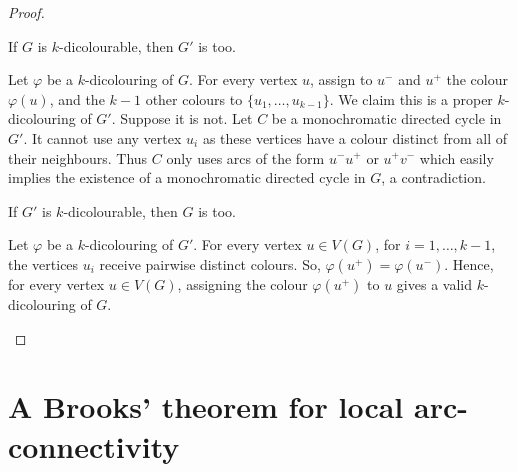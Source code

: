\begin{proof}

\begin{claim} 
If $G$ is $k$-dicolourable, then $G'$ is too. 
\end{claim}

\begin{proofclaim}
Let $\varphi$ be a $k$-dicolouring of $G$. For every vertex $u$, assign to $u^-$ and $u^+$ the colour $\varphi(u)$, and the $k-1$ other colours to $\{u_1, \dots, u_{k-1}\}$. We claim this is a proper $k$-dicolouring of $G'$. 
Suppose it is not. Let $C$ be a monochromatic directed cycle in $G'$. It cannot use any vertex $u_i$ as these vertices have a colour distinct from all of their neighbours. Thus $C$ only uses arcs of the form $u^-u^+$ or $u^+v^-$ which easily implies the existence of a monochromatic directed cycle in $G$, a contradiction.  
\end{proofclaim}

\begin{claim}
If $G'$ is $k$-dicolourable, then $G$ is too. 
\end{claim}

\begin{proofclaim}

Let $\varphi$ be a $k$-dicolouring of $G'$. 
For every vertex $u \in V(G)$, for $i=1, \dots, k-1$, the vertices $u_i$ receive pairwise distinct colours. So, $\varphi(u^+)=\varphi(u^-)$. Hence, for every vertex $u \in V(G)$, assigning the colour $\varphi(u^+)$ to $u$ gives a valid $k$-dicolouring of $G$. 
\end{proofclaim}
\end{proof}




\chapter{A Brooks' theorem for local arc-connectivity} \label{chpt:lambda_brooks}

